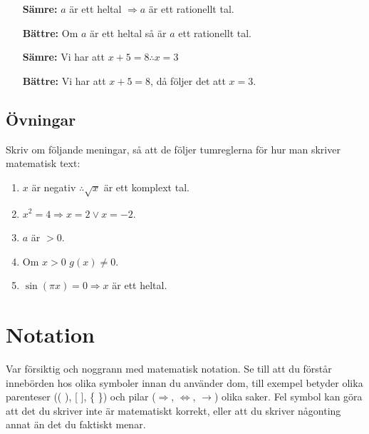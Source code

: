 \documentclass[titlepage]{article}
\begin{document}
\begin{itemize}
        \begin{itemize}[leftmargin=20mm]
            \item[\textbf{Sämre:}] $a$ är ett heltal $\Rightarrow a$ är ett rationellt tal.
            \item[\textbf{Bättre:}] Om $a$ är ett heltal så är $a$ ett rationellt tal.
            \vspace{2mm}
            \item[\textbf{Sämre:}] Vi har att $x+5=8 \therefore x = 3$
            \item[\textbf{Bättre:}]  Vi har att $x+5=8$, då följer det att $x = 3$.
        \end{itemize}
\end{itemize}



\subsection{Övningar}

Skriv om följande meningar, så att de följer tumreglerna för hur man skriver matematisk text:
\begin{enumerate}
    \item $x$ är negativ $\therefore \sqrt{x}$ är ett komplext tal.
    \item $x^2 = 4 \Rightarrow x=2 \vee x=-2$.
    \item $a$ är $>0$.
    \item Om $x>0$ $g(x) \neq 0$.
    \item $\sin(\pi x)= 0\Rightarrow x$ är ett heltal. 
\end{enumerate}



\section{Notation}

Var försiktig och noggrann med matematisk notation. Se till att du förstår innebörden hos olika symboler innan du använder dom, till exempel betyder olika parenteser (( ), [ ], \{ \}) och pilar ($\Rightarrow$, $\Leftrightarrow$, $\to$) olika saker. Fel symbol kan göra att det du skriver inte är matematiskt korrekt, eller att du skriver någonting annat än det du faktiskt menar.


\end{document}
